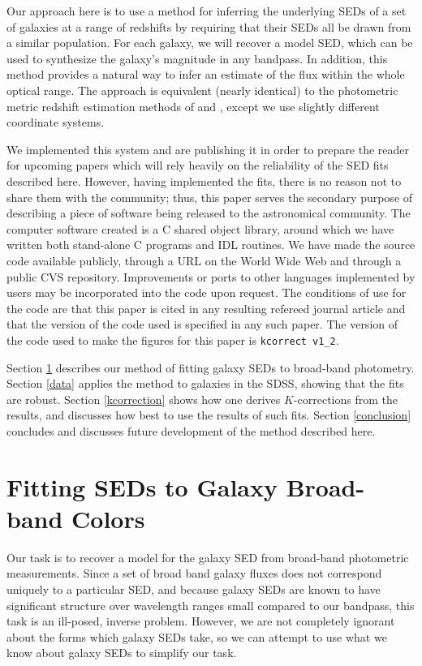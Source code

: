 \documentclass[10pt,preprint]{aastex}
\begin{document}
Our approach here is to use a method for inferring the underlying SEDs
of a set of galaxies at a range of redshifts by requiring that their
SEDs all be drawn from a similar population. For each galaxy, we will
recover a model SED, which can be used to synthesize the galaxy's
magnitude in any bandpass. In addition, this method provides a natural
way to infer an estimate of the flux within the whole optical range.
The approach is equivalent (nearly identical) to the photometric
metric redshift estimation methods of \citet{csabai99a} and
\citet{budavari00a}, except we use slightly different coordinate
systems.

We implemented this system and are publishing it in order to prepare
the reader for upcoming papers which will rely heavily on the
reliability of the SED fits described here.  However, having
implemented the fits, there is no reason not to share them with the
community; thus, this paper serves the secondary purpose of describing
a piece of software being released to the astronomical community. The
computer software created is a C shared object library, around which
we have written both stand-alone C programs and IDL routines. We have
made the source code available publicly, through a URL on the World
Wide Web and through a public CVS repository. Improvements or ports to
other languages implemented by users may be incorporated into the code
upon request. The conditions of use for the code are that this paper
is cited in any resulting refereed journal article and that the
version of the code used is specified in any such paper. The version
of the code used to make the figures for this paper is {\tt kcorrect
v1_2}.

Section \ref{sedfit} describes our method of fitting galaxy SEDs to
broad-band photometry. Section \ref{data} applies the method to
galaxies in the SDSS, showing that the fits are robust. Section
\ref{kcorrection} shows how one derives $K$-corrections from the
results, and discusses how best to use the results of such
fits. Section \ref{conclusion} concludes and discusses future
development of the method described here.

\section{Fitting SEDs to Galaxy Broad-band Colors}
\label{sedfit}

Our task is to recover a model for the galaxy SED from broad-band
photometric measurements. Since a set of broad band galaxy fluxes does
not correspond uniquely to a particular SED, and because galaxy SEDs
are known to have significant structure over wavelength ranges small
compared to our bandpass, this task is an ill-posed, inverse
problem. However, we are not completely ignorant about the forms which
galaxy SEDs take, so we can attempt to use what we know about galaxy
SEDs to simplify our task.
\end{document}
